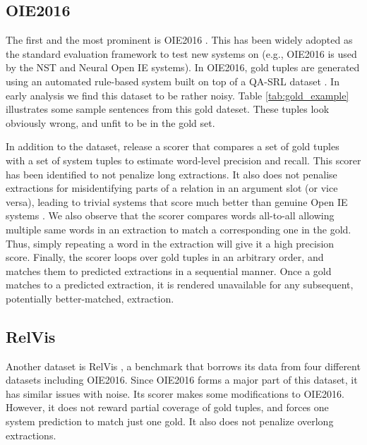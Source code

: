     \subsection{OIE2016}
        The first and the most prominent is OIE2016 \cite{OIE2016}. This has been widely adopted as the standard evaluation framework to test new systems on (e.g., OIE2016 is used by the NST \citep{Nst} and Neural Open IE \citep{cui&al18} systems).  In OIE2016, gold tuples are generated using an automated rule-based system built on top of a QA-SRL dataset \cite{QA-SRL}. In early analysis we find this dataset to be rather noisy. Table \ref{tab:gold_example} illustrates some sample sentences from this gold dateset. These tuples look obviously wrong, and unfit to be in the gold set.

        In addition to the dataset, \citet{OIE2016} release a scorer that compares a set of gold tuples with a set of system tuples to estimate word-level precision and recall. This scorer has been identified to not penalize long extractions. It also does not penalise extractions for misidentifying parts of a relation in an argument slot (or vice versa), leading to trivial systems that score much better than genuine Open IE systems  \cite{Wire57}. We also observe that the scorer compares words all-to-all allowing multiple same words in an extraction to match a corresponding one in the gold. Thus, simply repeating a word in the extraction will give it a high precision score. Finally, the scorer loops over gold tuples in an arbitrary order, and matches them to predicted extractions in a sequential manner. Once a gold matches to a predicted extraction, it is rendered unavailable for any subsequent, potentially better-matched, extraction.

    \subsection{RelVis}
        Another dataset is RelVis \cite{Relvis}, a benchmark that borrows its data from four different datasets including OIE2016. Since OIE2016 forms a major part of this dataset, it has similar issues with noise. Its scorer makes some modifications to OIE2016. However, it does not reward partial coverage of gold tuples, and forces one system prediction to match just one gold. It also does not penalize overlong extractions.
        
